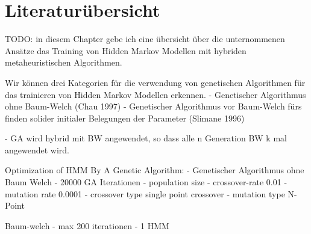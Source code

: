 \section{Literaturübersicht}
TODO: in diesem Chapter gebe ich eine übersicht über die unternommenen Ansätze das Training 
von Hidden Markov Modellen mit hybriden metaheuristischen Algorithmen.

Wir können drei Kategorien für die verwendung von genetischen Algorithmen für das trainieren von 
Hidden Markov Modellen erkennen.
- Genetischer Algorithmus ohne Baum-Welch (Chau 1997)
- Genetischer Algorithmus vor Baum-Welch fürs finden 
solider initialer Belegungen der Parameter (Slimane 1996)

- GA wird hybrid mit BW angewendet, so dass alle n Generation
BW k mal angewendet wird.

Optimization of HMM By A Genetic Algorithm:
- Genetischer Algorithmus ohne Baum Welch
- 20000 GA Iterationen
- population size
- crossover-rate 0.01
- mutation rate 0.0001
- crossover type single point crossover
- mutation type N-Point

Baum-welch
- max 200 iterationen 
- 1 HMM

